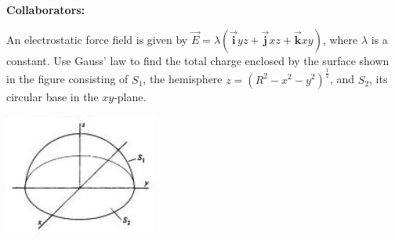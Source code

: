 \documentclass[11pt,letterpaper,boxed]{hmcpset}
\begin{document}
	
	\noindent\textbf{Collaborators:} 
	
	
	\begin{problem}[Schey II-8] 
		An electrostatic force field is given by $\vec{E} = \lambda (\vec{\textbf{i}}yz + \vec{\textbf{j}}xz + \vec{\textbf{k}}xy)$, where $\lambda$ is a constant. Use Gauss' law to find the total charge enclosed by the surface shown in the figure consisting of $S_1$, the hemisphere $z = (R^2 - x^2 - y^2)^{\frac{1}{2}}$, and $S_2$, its circular base in the $xy$-plane.
		\begin{center}
			\includegraphics[scale=0.9]{51m3pic2.jpg}
		\end{center}
		
	\end{problem}
	
	\begin{solution}
		\vfill
	\end{solution}
	\newpage
\end{document}
